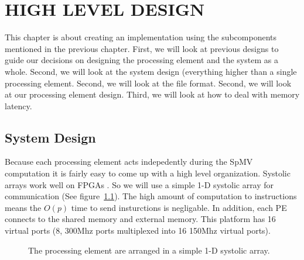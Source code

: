 \chapter{HIGH LEVEL DESIGN}
\label{chp:high_level_design}
This chapter is about creating an implementation using the subcomponents mentioned in the previous chapter. First, we will look at previous designs to guide our decisions on designing the processing element and the system as a whole. Second, we will look at the system design (everything higher than a single processing element. Second, we will look at the file format. Second, we will look at our processing element design. Third, we will look at how to deal with memory latency.
\section{System Design}
Because each processing element acts indepedently during the SpMV computation it is fairly easy to come up with a high level organization. Systolic arrays work well on FPGAs \cite{prelim:johnson}. So we will use a simple 1-D systolic array for communication (See figure~\ref{fig:systolic_array}). The high amount of computation to instructions means the $O(p)$ time to send insturctions is negligable. In addition, each PE connects to the shared memory and external memory. This platform has 16 virtual ports (8, 300Mhz ports multiplexed into 16 150Mhz virtual ports).
\begin{figure}
    \centering
    \caption[1-D Systolic array structure of processing elements]{The processing element are arranged in a simple 1-D systolic array.}
    \label{fig:systolic_array}
\end{figure}
